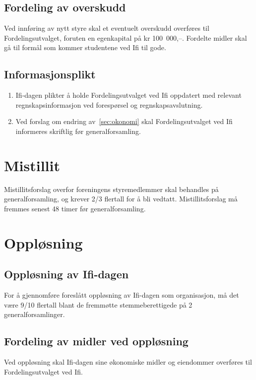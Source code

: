 \documentclass[norsk,a4paper]{article}
\begin{document}
\subsection{Fordeling av overskudd}
Ved innføring av nytt styre skal et eventuelt overskudd overføres til Fordelingsutvalget, foruten en egenkapital på kr 100~000,--. Fordelte midler skal gå til formål som kommer studentene ved Ifi til gode.
\subsection{Informasjonsplikt}
        \begin{enumerate}
            \item Ifi-dagen plikter å holde Fordelingsutvalget ved Ifi oppdatert med relevant regnskapsinformasjon ved forespørsel og regnskapsavslutning.
            \item Ved forslag om endring av~\ref{sec:okonomi} skal Fordelingsutvalget ved Ifi informeres skriftlig før generalforsamling. 
        \end{enumerate}

\section{Mistillit}
Mistillitsforslag overfor foreningens styremedlemmer skal behandles på generalforsamling, og krever 2/3 flertall for å bli vedtatt. Mistillitsforslag må fremmes senest 48 timer før generalforsamling.

\section{Oppløsning}
\subsection{Oppløsning av Ifi-dagen}
        For å gjennomføre foreslått oppløsning av Ifi-dagen som organisasjon, må det være 9/10 flertall
        blant de fremmøtte stemmeberettigede på 2 generalforsamlinger.
\subsection{Fordeling av midler ved oppløsning}
        Ved oppløsning skal Ifi-dagen sine økonomiske midler og eiendommer overføres til
		Fordelingsutvalget ved Ifi.\label{ref:lastpage}
\end{document}
